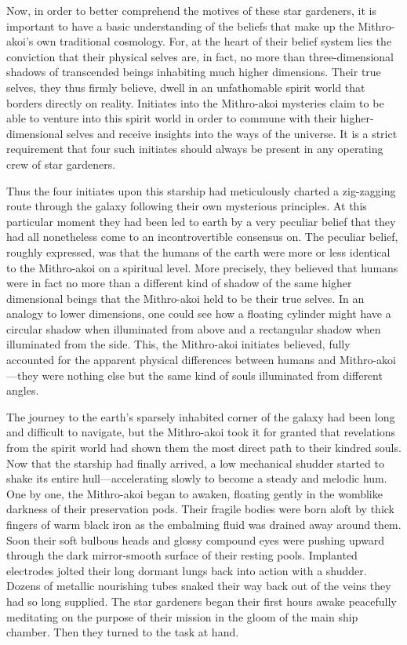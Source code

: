 \documentclass[12pt]{article}
\begin{document}
Now,
in order to better comprehend the motives of these star gardeners,
it is important to have a basic understanding of the beliefs that make up the Mithro-akoi's own traditional cosmology.
For, at the heart of their belief system lies the conviction that their physical selves are, in fact, no more than three-dimensional shadows of transcended beings inhabiting much higher dimensions.
Their true selves, they thus firmly believe, dwell in an unfathomable spirit world that borders directly on reality.
Initiates into the Mithro-akoi mysteries claim to be able to venture into this spirit world in order to commune with their higher-dimensional selves and receive insights into the ways of the universe.
It is a strict requirement that four such initiates should always be present in any operating crew of star gardeners.

Thus the four initiates upon this starship had meticulously charted a zig-zagging route through the galaxy following their own mysterious principles.
At this particular moment they had been led to earth by a very peculiar belief that they had all nonetheless come to an incontrovertible consensus on.
The peculiar belief, roughly expressed, was that the humans of the earth were more or less identical to the Mithro-akoi on a spiritual level.
More precisely, they believed that humans were in fact no more than a different kind of shadow of the same higher dimensional beings that the Mithro-akoi held to be their true selves.
In an analogy to lower dimensions, one could see how a floating cylinder might have a circular shadow when illuminated from above and a rectangular shadow when illuminated from the side.
This, the Mithro-akoi initiates believed, fully accounted for the apparent physical differences between humans and Mithro-akoi---they were nothing else but the same kind of souls illuminated from different angles.

The journey to the earth's sparsely inhabited corner of the galaxy had been long and difficult to navigate, 
but the Mithro-akoi took it for granted that revelations from the spirit world had shown them the most direct path to their kindred souls.
Now that the starship had finally arrived, a low mechanical shudder started to shake its entire hull---accelerating slowly to become a steady and melodic hum.
One by one, the Mithro-akoi began to awaken,
floating gently in the womblike darkness of their preservation pods.
Their fragile bodies were born aloft by thick fingers of warm black iron as the embalming fluid was drained away around them.
Soon their soft bulbous heads and glossy compound eyes were pushing upward through the dark mirror-smooth surface of their resting pools.
Implanted electrodes jolted their long dormant lungs back into action with a shudder.
Dozens of metallic nourishing tubes snaked their way back out of the veins they had so long supplied.
The star gardeners began their first hours awake peacefully meditating on the purpose of their mission in the gloom of the main ship chamber.
Then they turned to the task at hand.
\end{document}
